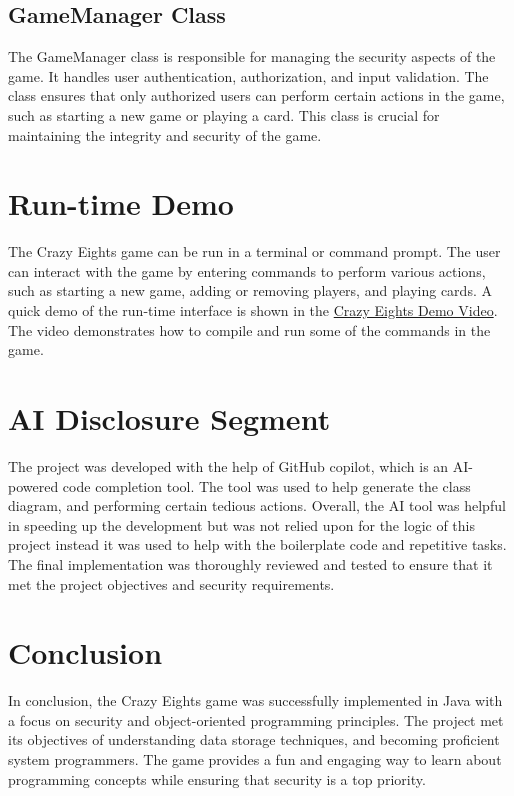 \documentclass[conference]{IEEEtran}
\begin{document}
\subsection{GameManager Class}
The GameManager class is responsible for managing the security aspects of the game. It handles user authentication, authorization, and input validation. The class ensures that only authorized users can perform certain actions in the game, such as starting a new game or playing a card. This class is crucial for maintaining the integrity and security of the game.

\section{Run-time Demo}
The Crazy Eights game can be run in a terminal or command prompt. The user can interact with the game by entering commands to perform various actions, such as starting a new game, adding or removing players, and playing cards. A quick demo of the run-time interface is shown in the \href{https://youtu.be/vTJYHRKo5vw}{Crazy Eights Demo Video}. The video demonstrates how to compile and run some of the commands in the game.

\section{AI Disclosure Segment}
The project was developed with the help of GitHub copilot, which is an AI-powered code completion tool. The tool was used to help generate  the class diagram, and performing certain tedious actions. Overall, the AI tool was helpful in speeding up the development but was not relied upon for the logic of this project instead it was used to help with the boilerplate code and repetitive tasks. The final implementation was thoroughly reviewed and tested to ensure that it met the project objectives and security requirements.

\section{Conclusion}
In conclusion, the Crazy Eights game was successfully implemented in Java with a focus on security and object-oriented programming principles. The project met its objectives of understanding data storage techniques, and becoming proficient system programmers. The game provides a fun and engaging way to learn about programming concepts while ensuring that security is a top priority.
\end{document}
